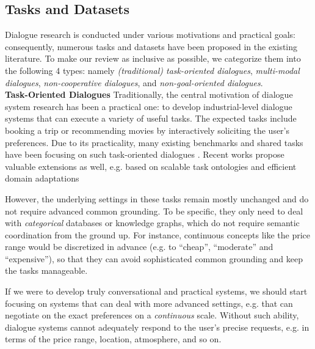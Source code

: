 \subsection{Tasks and Datasets}
\label{02_subsec:tasks_and_datasets}

Dialogue research is conducted under various motivations and practical goals: consequently, numerous tasks and datasets have been proposed in the existing literature. To make our review as inclusive as possible, we categorize them into the following 4 types: namely \textit{(traditional) task-oriented dialogues}, \textit{multi-modal dialogues}, \textit{non-cooperative dialogues}, and \textit{non-goal-oriented dialogues}.
\\

\noindent
\textbf{Task-Oriented Dialogues}\quad
Traditionally, the central motivation of dialogue system research has been a practical one: to develop industrial-level dialogue systems that can execute a variety of useful tasks. The expected tasks include booking a trip \citep{elasri2017frames} or recommending movies \citep{chen-etal-2019-towards} by interactively soliciting the user's preferences. Due to its practicality, many existing benchmarks and shared tasks have been focusing on such task-oriented dialogues \citep{henderson-etal-2014-second,budzianowski-etal-2018-multiwoz,lee2019multi}. Recent works propose valuable extensions as well, e.g. based on scalable task ontologies \citep{rastogi2020towards} and efficient domain adaptations \citep{shalyminov2020fast}

However, the underlying settings in these tasks remain mostly unchanged and do not require advanced common grounding. To be specific, they only need to deal with \textit{categorical} databases or knowledge graphs, which do not require semantic coordination from the ground up. For instance, continuous concepts like the price range would be discretized in advance (e.g. to ``cheap'', ``moderate'' and ``expensive''), so that they can avoid sophisticated common grounding and keep the tasks manageable. 

If we were to develop truly conversational and practical systems, we should start focusing on systems that can deal with more advanced settings, e.g. that can negotiate on the exact preferences on a \textit{continuous} scale. Without such ability, dialogue systems cannot adequately respond to the user's precise requests, e.g. in terms of the price range, location, atmosphere, and so on.\\

